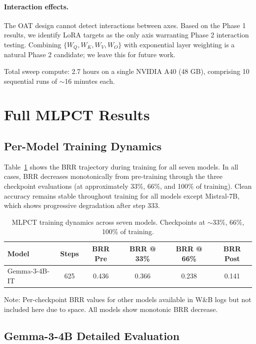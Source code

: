\paragraph{Interaction effects.} The OAT design cannot detect interactions between axes. Based on the Phase 1 results, we identify LoRA targets as the only axis warranting Phase 2 interaction testing. Combining $\{W_Q, W_K, W_V, W_O\}$ with exponential layer weighting is a natural Phase 2 candidate; we leave this for future work.

Total sweep compute: 2.7 hours on a single NVIDIA A40 (48 GB), comprising 10 sequential runs of $\sim$16 minutes each.


\section{Full MLPCT Results}
\label{app:mlpct}

\subsection{Per-Model Training Dynamics}

Table~\ref{tab:mlpct_dynamics} shows the BRR trajectory during training for all seven models. In all cases, BRR decreases monotonically from pre-training through the three checkpoint evaluations (at approximately 33\%, 66\%, and 100\% of training). Clean accuracy remains stable throughout training for all models except Mistral-7B, which shows progressive degradation after step 333.

\begin{table}[h]
\centering
\caption{MLPCT training dynamics across seven models. Checkpoints at $\sim$33\%, 66\%, 100\% of training.}
\label{tab:mlpct_dynamics}
\small
\begin{tabular}{lccccc}
\toprule
\textbf{Model} & \textbf{Steps} & \textbf{BRR Pre} & \textbf{BRR @ 33\%} & \textbf{BRR @ 66\%} & \textbf{BRR Post} \\
\midrule
Gemma-3-4B-IT & 625 & 0.436 & 0.366 & 0.238 & 0.141 \\
\bottomrule
\end{tabular}
\vspace{0.3em}

\raggedright\footnotesize
Note: Per-checkpoint BRR values for other models available in W\&B logs but not included here due to space. All models show monotonic BRR decrease.
\end{table}

\subsection{Gemma-3-4B Detailed Evaluation}

